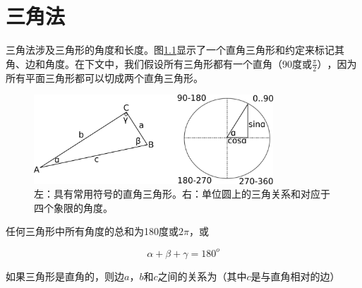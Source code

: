 
\chapter{三角法}

三角法涉及三角形的角度和长度。图\ref{fig:triangle}显示了一个直角三角形和约定来标记其角、边和角度。在下文中，我们假设所有三角形都有一个直角（90度或$\frac{\pi}{2}）$，因为所有平面三角形都可以切成两个直角三角形。

\begin{figure}[!htb]
\centering
\includegraphics[width=0.8\textwidth]{figs/triangle}
\caption{左：具有常用符号的直角三角形。右：单位圆上的三角关系和对应于四个象限的角度。}
\label{fig:triangle}
\end{figure}


任何三角形中所有角度的总和为180度或$2\pi$，或

\begin{equation}
\alpha + \beta + \gamma = 180^o
\end{equation}


如果三角形是直角的，则边$a$，$b$和$c$之间的关系为（其中$c$是与直角相对的边）


